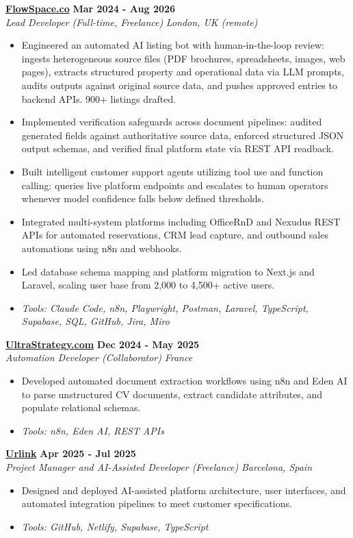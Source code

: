 \documentclass[a4paper,11pt]{article}
\newcommand{\role}[4]{%
 \textbf{#1} \hfill \textbf{#2}\\[1pt]%
 \textit{#3} \hfill \textit{#4}\\[2pt]%
}
\begin{document}
\role{\href{https://flowspace.co}{FlowSpace.co}}{Mar 2024 - Aug 2026}{Lead Developer (Full-time, Freelance)}{London, UK (remote)}
\begin{itemize}
 \item Engineered an automated AI listing bot with human-in-the-loop review: ingests heterogeneous source files (PDF brochures, spreadsheets, images, web pages), extracts structured property and operational data via LLM prompts, audits outputs against original source data, and pushes approved entries to backend APIs. 900+ listings drafted.
 \item Implemented verification safeguards across document pipelines: audited generated fields against authoritative source data, enforced structured JSON output schemas, and verified final platform state via REST API readback.
 \item Built intelligent customer support agents utilizing tool use and function calling: queries live platform endpoints and escalates to human operators whenever model confidence falls below defined thresholds.
 \item Integrated multi-system platforms including OfficeRnD and Nexudus REST APIs for automated reservations, CRM lead capture, and outbound sales automations using n8n and webhooks.
 \item Led database schema mapping and platform migration to Next.js and Laravel, scaling user base from 2,000 to 4,500+ active users.
 \item \textit{Tools: Claude Code, n8n, Playwright, Postman, Laravel, TypeScript, Supabase, SQL, GitHub, Jira, Miro}
\end{itemize}

\role{\href{https://ultrastrategy.com}{UltraStrategy.com}}{Dec 2024 - May 2025}{Automation Developer (Collaborator)}{France}
\begin{itemize}
 \item Developed automated document extraction workflows using n8n and Eden AI to parse unstructured CV documents, extract candidate attributes, and populate relational schemas.
 \item \textit{Tools: n8n, Eden AI, REST APIs}
\end{itemize}

\role{\href{https://smarturlink.com/}{Urlink}}{Apr 2025 - Jul 2025}{Project Manager and AI-Assisted Developer (Freelance)}{Barcelona, Spain}
\begin{itemize}
 \item Designed and deployed AI-assisted platform architecture, user interfaces, and automated integration pipelines to meet customer specifications.
 \item \textit{Tools: GitHub, Netlify, Supabase, TypeScript}
\end{itemize}
\end{document}

